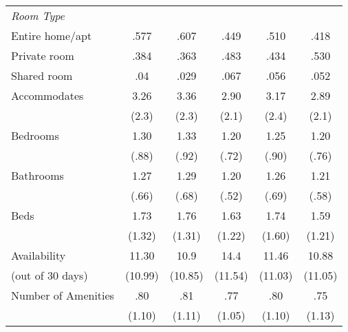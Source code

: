 {\begin{longtable}{l*{5}{c}}
\textit{Room Type} \\
Entire home/apt      & .577   	&      .607	&      .449  &      .510		&    .418\\
Private room        & 	.384		&      .363	&      .483  &      .434		&    .530\\
Shared room        &	.04	 	&      .029	&      .067  &      .056		&    .052\\
[1em]
Accommodates        &      3.26	&      3.36  &      2.90		&    3.17 		&	 2.89\\
                    &     (2.3)         &     (2.3)         &     (2.1)         &     (2.4)         & (2.1)\\
[1em]
Bedrooms       &      1.30 &      1.33         &      1.20         &      1.25   & 1.20      \\
                    &     (.88)         &     (.92)         &     (.72)         &     (.90)       & (.76)  \\
[1em]
Bathrooms     &      1.27         &       1.29         &      1.20         &      1.26 & 1.21         \\
                    &     (.66)         &     (.68)         &     (.52)         &     (.69)         & (.58)\\
[1em]
Beds          &      1.73&      1.76         &      1.63         &      1.74         & 1.59\\
                    &     (1.32)         &     (1.31)         &     (1.22)         &     (1.60)   & (1.21)      \\
[1em]
Availability        &      11.30&      10.9&      14.4 &      11.46  	& 	10.88\\
(out of 30 days)               & (10.99)     &     (10.85)         &     (11.54)         &     (11.03)         &     (11.05)         \\
[1em]
Number of Amenities        &      .80		&      .81&      .77 &      .80  	& 	.75\\
               & (1.10)     &     (1.11)         &     (1.05)         &     (1.10)         &     (1.13)         \\


\end{longtable}}
